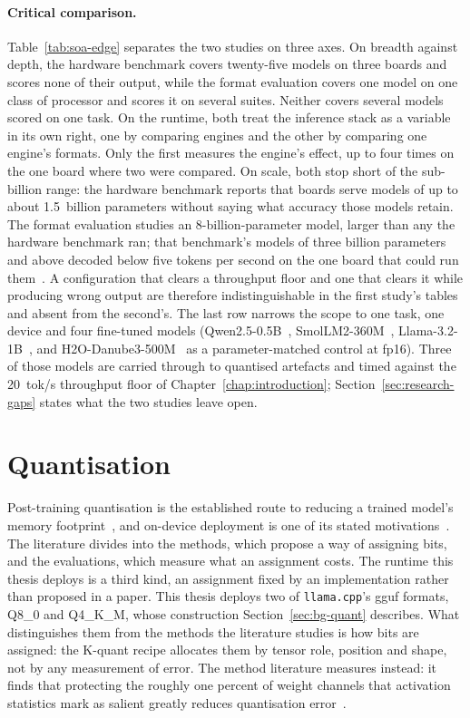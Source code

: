 \paragraph{Critical comparison.} Table~\ref{tab:soa-edge} separates the two studies on three
axes. On breadth against depth, the hardware benchmark covers twenty-five models on three boards
and scores none of their output, while the format evaluation covers one model on one class of
processor and scores it on several suites. Neither covers several models scored on one task. On
the runtime, both treat the inference stack as a variable in its own right, one by comparing
engines and the other by comparing one engine's formats. Only the first measures the engine's
effect, up to four times on the one board where two were compared. On scale, both stop
short of the sub-billion range: the hardware benchmark reports that boards serve models of up to
about 1.5~billion parameters without saying what accuracy those models retain. The format
evaluation studies an 8-billion-parameter model, larger than any the hardware benchmark ran; that
benchmark's models of three billion parameters and above decoded below five tokens per second on
the one board that could run them~\cite{sbc2025}. A
configuration that clears a throughput floor and one that clears it while producing wrong output
are therefore indistinguishable in the first study's tables and absent from the second's. The
last row narrows the scope to one task, one device and four fine-tuned models
(Qwen2.5-0.5B~\cite{qwen25}, SmolLM2-360M~\cite{smollm2}, Llama-3.2-1B~\cite{llama32}, and
H2O-Danube3-500M~\cite{danube3} as a parameter-matched control at fp16). Three of those
models are carried through to quantised artefacts and timed against the 20~tok/s throughput floor
of Chapter~\ref{chap:introduction}; Section~\ref{sec:research-gaps} states what the two studies
leave open.

\clearpage
\section{Quantisation}
\label{sec:soa-quantisation}
Post-training quantisation is the established route to reducing a trained model's memory
footprint~\cite{gptq}, and on-device deployment is one of its stated motivations~\cite{awq}. The
literature divides into the methods, which propose a way of assigning bits, and the evaluations,
which measure what an assignment costs. The runtime this thesis deploys is a third kind, an
assignment fixed by an implementation rather than proposed in a paper. This thesis deploys two of
\texttt{llama.cpp}'s
\gls{gguf} formats, Q8\_0 and Q4\_K\_M, whose construction Section~\ref{sec:bg-quant} describes.
What distinguishes them from the methods the literature studies is how bits are assigned: the
K-quant recipe allocates them by tensor role, position and shape, not by any measurement of error.
The method literature measures instead: it finds that protecting the roughly one percent of weight
channels that activation statistics mark as salient greatly reduces quantisation
error~\cite{awq}.

